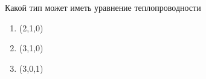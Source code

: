 Какой тип может иметь уравнение теплопроводности

\begin{enumerate}[label=\arabic*)]
    \item (2,1,0)
    \item (3,1,0)
    \item (3,0,1)
\end{enumerate}

